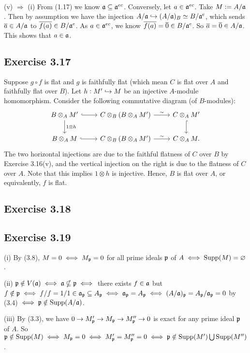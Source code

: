 \documentclass[../A&M.tex]{subfiles}
\begin{document}
(v) $\Rightarrow$ (i) From (1.17) we know $\mathfrak{a} \subseteq \mathfrak{a}^{ec}$. Conversely, let $a\in\mathfrak{a}^{ec}$. Take $M:=A/\mathfrak{a}$. Then by assumption we have the injection $A/\mathfrak{a} \hookrightarrow (A/\mathfrak{a})_B \simeq B/\mathfrak{a}^e$, which sends $\overline{a}\in A/\mathfrak{a}$ to $\overline{f(a)} \in B/\mathfrak{a}^e$. As $a \in \mathfrak{a}^{ec}$, we know $\overline{f(a)} = \overline{0} \in B/\mathfrak{a}^e$. So $\overline{a} = \overline{0} \in A/\mathfrak{a}$. This shows that $a\in\mathfrak{a}$.

\subsection*{Exercise 3.17}

Suppose $g\circ f$ is flat and $g$ is faithfully flat (which mean $C$ is flat over $A$ and faithfully flat over $B$). Let $h: M' \hookrightarrow M$ be an injective $A$-module homomorphism. Consider the following commutative diagram (of $B$-modules):
$$
\begin{tikzcd}
B \otimes_A M' \arrow[r, hook] \arrow[d, "1 \otimes h"] & C \otimes_B (B\otimes_A M') \hisoarrow{r} & C \otimes_A M' \arrow[d, hook] \\ 
B \otimes_A M \arrow[r, hook] & C \otimes_B (B\otimes_A M') \hisoarrow{r} & C \otimes_A M.
\end{tikzcd}
$$
The two horizontal injections are due to the faithful flatness of $C$ over $B$ by Exercise 3.16(v), and the vertical injection on the right is due to the flatness of $C$ over $A$. Note that this implies $1\otimes h$ is injective. Hence, $B$ is flat over $A$, or equivalently, $f$ is flat.

\subsection*{Exercise 3.18}

\subsection*{Exercise 3.19}

(i) By (3.8), $M=0 \iff M_{\mathfrak{p}} = 0$ for all prime ideals $\mathfrak{p}$ of $A \iff \operatorname{Supp}(M) = \varnothing$.

(ii) $\mathfrak{p} \notin V(\mathfrak{a}) \iff \mathfrak{a} \nsubseteq \mathfrak{p} \iff$ there exists $f \in \mathfrak{a}$ but $f \notin \mathfrak{p} \iff f/f = 1/1 \in \mathfrak{a}_{\mathfrak{p}} \subseteq A_{\mathfrak{p}}\iff \mathfrak{a}_{\mathfrak{p}} = A_{\mathfrak{p}} \iff (A/\mathfrak{a})_{\mathfrak{p}} = A_{\mathfrak{p}}/\mathfrak{a}_{\mathfrak{p}} = 0$ by (3.4) $\iff \mathfrak{p} \notin \operatorname{Supp}(A/\mathfrak{a})$.

(iii) By (3.3), we have $0 \to M'_{\mathfrak{p}} \to M_{\mathfrak{p}} \to M''_{\mathfrak{p}} \to 0$ is exact for any prime ideal $\mathfrak{p}$ of $A$. So $\mathfrak{p} \notin \operatorname{Supp}(M) \iff M_{\mathfrak{p}}=0 \iff M'_{\mathfrak{p}} = M''_{\mathfrak{p}} = 0 \iff \mathfrak{p} \notin \operatorname{Supp}(M') \bigcup \operatorname{Supp}(M'')$.
\end{document}
